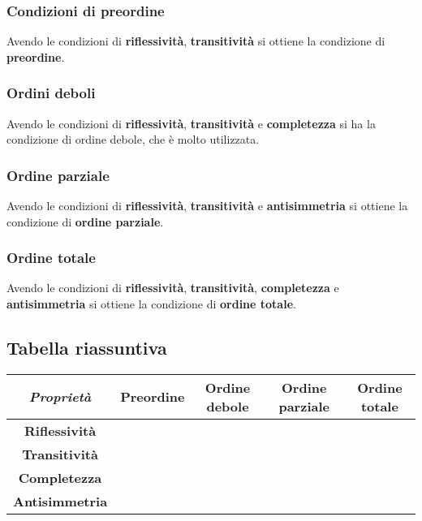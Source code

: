 \documentclass[\main/main.tex]{subfiles}
\begin{document}
\subsubsection{Condizioni di preordine}
Avendo le condizioni di \textbf{riflessività}, \textbf{transitività} si ottiene la condizione di \textbf{preordine}.

\subsubsection{Ordini deboli}
Avendo le condizioni di \textbf{riflessività}, \textbf{transitività} e \textbf{completezza} si ha la condizione di ordine debole, che è molto utilizzata.

\subsubsection{Ordine parziale}
Avendo le condizioni di \textbf{riflessività}, \textbf{transitività} e \textbf{antisimmetria} si ottiene la condizione di \textbf{ordine parziale}.

\subsubsection{Ordine totale}
Avendo le condizioni di \textbf{riflessività}, \textbf{transitività}, \textbf{completezza} e \textbf{antisimmetria} si ottiene la condizione di \textbf{ordine totale}.

\subsection{Tabella riassuntiva}
\begin{center}
	\begin{tabular}{|c|c|c|c|c|}
		\hline
		\textit{Proprietà} & \textbf{Preordine} & \textbf{Ordine debole} & \textbf{Ordine parziale} & \textbf{Ordine totale}\\
		\hline
		\textbf{Riflessività} & \checkmark & \checkmark & \checkmark & \checkmark \\
		\hline
		\textbf{Transitività} & \checkmark & \checkmark & \checkmark & \checkmark \\
		\hline
		\textbf{Completezza} &  & \checkmark &  & \checkmark \\
		\hline
		\textbf{Antisimmetria} &  &  & \checkmark & \checkmark \\
		\hline
	\end{tabular}
\end{center}
\end{document}
